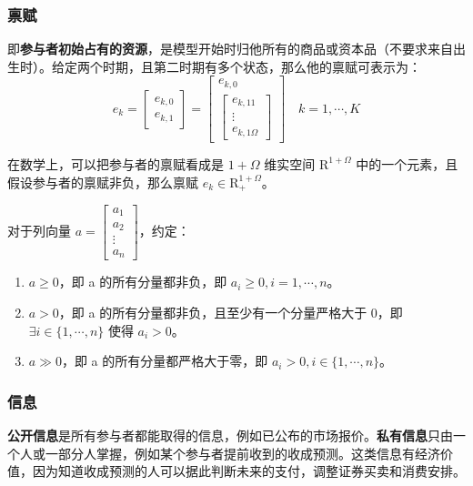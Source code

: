 \subsubsection{禀赋}
即\textbf{参与者初始占有的资源}，是模型开始时归他所有的商品或资本品（不要求来自出生时）。给定两个时期，且第二时期有多个状态，那么他的禀赋可表示为：
    \[
    e_k=\begin{bmatrix}e_{k,0} \\ e_{k,1}\end{bmatrix}
    =\begin{bmatrix}e_{k,0} \\ \begin{bmatrix}e_{k,11} \\ \vdots \\ e_{k,1\Omega}\end{bmatrix}
    \end{bmatrix}
    \quad k=1,\cdots,K
    \]

    在数学上，可以把参与者的禀赋看成是 $1+\Omega$ 维实空间 $\mathrm{R}^{1+\Omega}$ 中的一个元素，且假设参与者的禀赋非负，那么禀赋 $e_k \in \mathrm{R}^{1+\Omega}_{+}$。

    \begin{tcolorbox}[knowledge,title=向量不等号约定]
对于列向量 $a=\begin{bmatrix}a_1 \\ a_2 \\ \vdots \\ a_n\end{bmatrix}$，约定：
    \begin{enumerate}
        \item $a \ge 0$，即 a 的所有分量都非负，即 $a_i \ge 0, i=1,\cdots,n$。
        \item $a > 0$，即 a 的所有分量都非负，且至少有一个分量严格大于 0，即 $\exists i \in \{1,\cdots,n\}$ 使得 $a_i > 0$。
        \item $a \gg 0$，即 a 的所有分量都严格大于零，即 $a_i > 0, i \in \{1,\cdots,n\}$。
    \end{enumerate}
\end{tcolorbox}

\subsubsection{信息}
\textbf{公开信息}是所有参与者都能取得的信息，例如已公布的市场报价。\textbf{私有信息}只由一个人或一部分人掌握，例如某个参与者提前收到的收成预测。这类信息有经济价值，因为知道收成预测的人可以据此判断未来的支付，调整证券买卖和消费安排。

